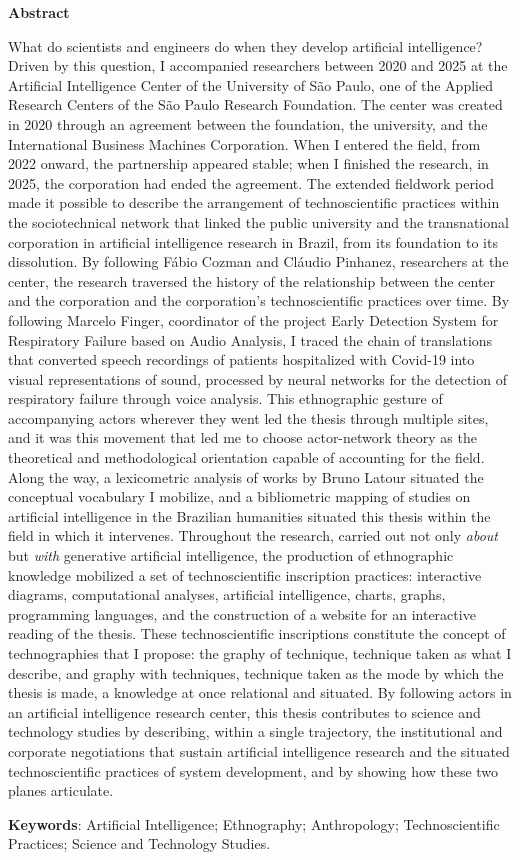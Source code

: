 \begin{center}
  \large{\textbf{Abstract}}
\end{center}
\begingroup
{}
\noindent What do scientists and engineers do when they develop artificial intelligence? Driven by this question, I accompanied researchers between 2020 and 2025 at the Artificial Intelligence Center of the University of São Paulo, one of the Applied Research Centers of the São Paulo Research Foundation. The center was created in 2020 through an agreement between the foundation, the university, and the International Business Machines Corporation. When I entered the field, from 2022 onward, the partnership appeared stable; when I finished the research, in 2025, the corporation had ended the agreement. The extended fieldwork period made it possible to describe the arrangement of technoscientific practices within the sociotechnical network that linked the public university and the transnational corporation in artificial intelligence research in Brazil, from its foundation to its dissolution. By following Fábio Cozman and Cláudio Pinhanez, researchers at the center, the research traversed the history of the relationship between the center and the corporation and the corporation's technoscientific practices over time. By following Marcelo Finger, coordinator of the project Early Detection System for Respiratory Failure based on Audio Analysis, I traced the chain of translations that converted speech recordings of patients hospitalized with Covid-19 into visual representations of sound, processed by neural networks for the detection of respiratory failure through voice analysis. This ethnographic gesture of accompanying actors wherever they went led the thesis through multiple sites, and it was this movement that led me to choose actor-network theory as the theoretical and methodological orientation capable of accounting for the field. Along the way, a lexicometric analysis of works by Bruno Latour situated the conceptual vocabulary I mobilize, and a bibliometric mapping of studies on artificial intelligence in the Brazilian humanities situated this thesis within the field in which it intervenes. Throughout the research, carried out not only \textit{about} but \textit{with} generative artificial intelligence, the production of ethnographic knowledge mobilized a set of technoscientific inscription practices: interactive diagrams, computational analyses, artificial intelligence, charts, graphs, programming languages, and the construction of a website for an interactive reading of the thesis. These technoscientific inscriptions constitute the concept of technographies that I propose: the graphy of technique, technique taken as what I describe, and graphy with techniques, technique taken as the mode by which the thesis is made, a knowledge at once relational and situated. By following actors in an artificial intelligence research center, this thesis contributes to science and technology studies by describing, within a single trajectory, the institutional and corporate negotiations that sustain artificial intelligence research and the situated technoscientific practices of system development, and by showing how these two planes articulate.

\noindent \textbf{Keywords}: Artificial Intelligence; Ethnography; Anthropology; Technoscientific Practices; Science and Technology Studies.
\endgroup
{}